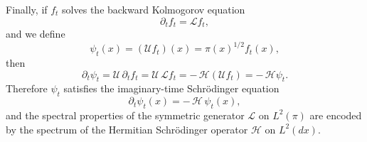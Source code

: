 \documentclass[11pt]{article}
\begin{document}
Finally, if $f_t$ solves the backward Kolmogorov equation
\begin{equation}
\partial_t f_t
=
\mathcal L f_t,
\end{equation}
and we define
\begin{equation}
\psi_t(x)
=
(\mathcal U f_t)(x)
=
\pi(x)^{1/2} f_t(x),
\end{equation}
then
\begin{equation}
\partial_t \psi_t
=
\mathcal U\,\partial_t f_t
=
\mathcal U\,\mathcal L f_t
=
-\,\mathcal H(\mathcal U f_t)
=
-\,\mathcal H\psi_t.
\end{equation}
Therefore $\psi_t$ satisfies the imaginary-time Schr\"odinger equation
\begin{equation}
\partial_t \psi_t(x)
=
-\,\mathcal H\,\psi_t(x),
\end{equation}
and the spectral properties of the symmetric generator $\mathcal L$ on $L^2(\pi)$ are encoded by the spectrum of the Hermitian Schr\"odinger operator $\mathcal H$ on $L^2(dx)$.
\end{document}
